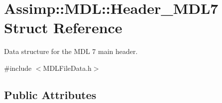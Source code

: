 \hypertarget{struct_assimp_1_1_m_d_l_1_1_header___m_d_l7}{\section{Assimp\+:\+:M\+D\+L\+:\+:Header\+\_\+\+M\+D\+L7 Struct Reference}
\label{struct_assimp_1_1_m_d_l_1_1_header___m_d_l7}
}


Data structure for the M\+D\+L 7 main header.  




{\ttfamily \#include $<$M\+D\+L\+File\+Data.\+h$>$}

\subsection*{Public Attributes}
